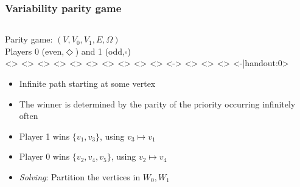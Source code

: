 \documentclass[aspectratio=169]{beamer}
\newcounter{picite}
\newcounter{piciteb}
\begin{document}
\begin{frame}[t]
\frametitle{Variability parity game}
\begin{columns}[T]
	\begin{column}{0.5\textwidth}
		\large Parity game: $(V,V_0,V_1,E,\Omega)$\small\\
		Players 0 (even,$\Diamond$) and 1 (odd,$\square$)\\
			\setcounter{picite}{0}%
			\def\showprio{0}
			\def\token{0}%
			\only<\thepicite>{}\pause%
			\def\token{1}%
			\only<\thepicite>{}\pause%
			\def\token{3}%
			\only<\thepicite>{}\pause%
			\def\token{4}%
			\only<\thepicite>{}\pause%
			\def\token{5}%
			\only<\thepicite>{}\pause%
			\def\token{2}%
			\only<\thepicite>{}\pause%
			\def\token{4}%
			\only<\thepicite>{}\pause%
			\def\token{5}%
			\only<\thepicite>{}\pause%
			\def\token{2}%
			\only<\thepicite>{}\pause%
			\def\token{-1}%
			\only<\thepicite>{}
			\def\showprio{1}%
			\setcounter{piciteb}{\thepicite}%
			\only<\thepicite-\thepiciteb>{}%
			\def\token{1}%
			\only<\thepicite>{}%
			\def\token{3}%
			\only<\thepicite>{}%
			\def\token{1}%
			\only<\thepicite>{}%
			\def\token{-1}%
			\only<\thepicite-|handout:0>{}%
		\begin{itemize}
			\item Infinite path starting at some vertex\pause
			\item The winner is determined by the parity of the priority occurring infinitely often\pause
			\pause\pause\pause%
			\item Player 1 wins $\{v_1,v_3\}$, using $v_3 \mapsto v_1$\pause
			\item Player 0 wins $\{v_2,v_4,v_5\}$, using $v_2 \mapsto v_4$\pause{}
			\item \textit{Solving}: Partition the vertices in $W_0,W_1$\pause{}
		\end{itemize}

\end{column}
\end{columns}
\end{frame}
\end{document}
